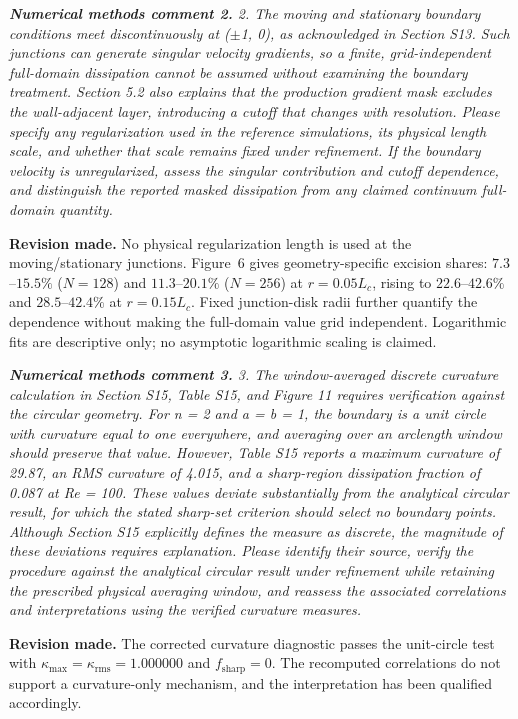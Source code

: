 \documentclass[11pt,a4paper]{article}
\newcommand{\qcomment}[1]{\textcolor{deepblue}{\itshape #1}}
\newcommand{\revwork}[1]{\textbf{\textcolor{revgreen}{#1}}}
\begin{document}
\medskip
\noindent\qcomment{\textbf{Numerical methods comment 2.} 2. The moving and stationary boundary conditions meet discontinuously at ($\pm$1, 0), as acknowledged in Section S13. Such junctions can generate singular velocity gradients, so a finite, grid-independent full-domain dissipation cannot be assumed without examining the boundary treatment. Section 5.2 also explains that the production gradient mask excludes the wall-adjacent layer, introducing a cutoff that changes with resolution. Please specify any regularization used in the reference simulations, its physical length scale, and whether that scale remains fixed under refinement. If the boundary velocity is unregularized, assess the singular contribution and cutoff dependence, and distinguish the reported masked dissipation from any claimed continuum full-domain quantity.}

\noindent\revwork{Revision made.} No physical regularization length is used at the moving/stationary junctions. Figure~6 gives geometry-specific excision shares: $7.3$--$15.5\%$ ($N=128$) and $11.3$--$20.1\%$ ($N=256$) at $r=0.05L_c$, rising to $22.6$--$42.6\%$ and $28.5$--$42.4\%$ at $r=0.15L_c$. Fixed junction-disk radii further quantify the dependence without making the full-domain value grid independent. Logarithmic fits are descriptive only; no asymptotic logarithmic scaling is claimed.

\medskip
\noindent\qcomment{\textbf{Numerical methods comment 3.} 3. The window-averaged discrete curvature calculation in Section S15, Table S15, and Figure 11 requires verification against the circular geometry. For n = 2 and a = b = 1, the boundary is a unit circle with curvature equal to one everywhere, and averaging over an arclength window should preserve that value. However, Table S15 reports a maximum curvature of 29.87, an RMS curvature of 4.015, and a sharp-region dissipation fraction of 0.087 at Re = 100. These values deviate substantially from the analytical circular result, for which the stated sharp-set criterion should select no boundary points. Although Section S15 explicitly defines the measure as discrete, the magnitude of these deviations requires explanation. Please identify their source, verify the procedure against the analytical circular result under refinement while retaining the prescribed physical averaging window, and reassess the associated correlations and interpretations using the verified curvature measures.}

\noindent\revwork{Revision made.} The corrected curvature diagnostic passes the unit-circle test with $\kappa_{\max}=\kappa_{\mathrm{rms}}=1.000000$ and $f_{\mathrm{sharp}}=0$. The recomputed correlations do not support a curvature-only mechanism, and the interpretation has been qualified accordingly.
\end{document}
